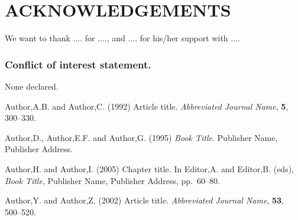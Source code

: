 \documentclass[a4,center,fleqn]{NAR}
\begin{document}
\section{ACKNOWLEDGEMENTS}

We want to thank .... for ...., and .... for his/her support with ....


\subsubsection{Conflict of interest statement.} None declared.
\newpage


\begin{thebibliography}{4}

Author,A.B. and Author,C. (1992)
Article title.
\textit{Abbreviated Journal Name}, \textbf{5}, 300--330.

Author,D., Author,E.F. and Author,G. (1995)
\textit{Book Title}.
Publisher Name, Publisher Address.

Author,H. and Author,I. (2005)
Chapter title.
In
Editor,A. and Editor,B. (eds),
\textit{Book Title},
Publisher Name, Publisher Address,
pp.\ 60--80.

Author,Y. and Author,Z. (2002)
Article title.
\textit{Abbreviated Journal Name}, \textbf{53}, 500--520.

\end{thebibliography}
\end{document}
